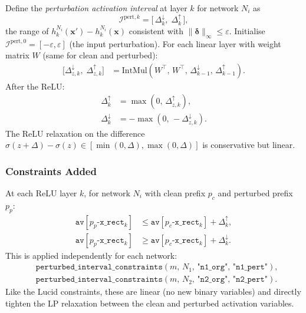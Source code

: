 \documentclass[11pt,a4paper]{article}
\theoremstyle{definition}
\theoremstyle{plain}
\newcommand{\NN}[1]{N_{#1}}
\newcommand{\vx}{\mathbf{x}}
\newcommand{\ve}{\boldsymbol{\delta}}
\newcommand{\vxp}{\mathbf{x}'}
\newcommand{\eps}{\varepsilon}
\newcommand{\RI}[1]{\mathcal{I}^{#1}}
\begin{document}
Define the \emph{perturbation activation interval} at layer $k$ for network $\NN{i}$ as
\[
  \RI{\mathrm{pert},k} = \bigl[\,\Delta_k^{\downarrow},\; \Delta_k^{\uparrow}\,\bigr],
\]
the range of $h_k^{\NN{i}}(\vxp) - h_k^{\NN{i}}(\vx)$ consistent with $\|\ve\|_\infty \le \eps$. Initialise $\RI{\mathrm{pert},0} = [-\eps, \eps]$ (the input perturbation). For each linear layer with weight matrix $W$ (same for clean and perturbed):
\begin{align}
  \bigl[\Delta_{z,k}^{\downarrow},\; \Delta_{z,k}^{\uparrow}\bigr] &= \mathrm{IntMul}(W^\top,\, W^\top,\, \Delta_{k-1}^{\downarrow},\, \Delta_{k-1}^{\uparrow}). \label{eq:pert_linear}
\end{align}
After the ReLU:
\begin{align}
  \Delta_k^{\uparrow} &= \max(0,\, \Delta_{z,k}^{\uparrow}), \label{eq:pert_relu_up}\\
  \Delta_k^{\downarrow} &= -\max(0,\, -\Delta_{z,k}^{\downarrow}). \label{eq:pert_relu_down}
\end{align}
The ReLU relaxation on the difference $\sigma(z+\Delta) - \sigma(z) \in [\min(0,\Delta), \max(0,\Delta)]$ is conservative but linear.

\subsubsection{Constraints Added}

At each ReLU layer $k$, for network $\NN{i}$ with clean prefix $p_c$ and perturbed prefix $p_p$:
\begin{align}
  \mathtt{av}[p_p\text{-}\mathtt{x\_rect}_k] &\le \mathtt{av}[p_c\text{-}\mathtt{x\_rect}_k] + \Delta_k^{\uparrow}, \label{eq:pertc_up}\\
  \mathtt{av}[p_p\text{-}\mathtt{x\_rect}_k] &\ge \mathtt{av}[p_c\text{-}\mathtt{x\_rect}_k] + \Delta_k^{\downarrow}. \label{eq:pertc_down}
\end{align}
This is applied independently for each network:
\begin{align*}
  &\texttt{perturbed\_interval\_constraints}(m,\, \NN{1},\, \texttt{"n1\_org"},\, \texttt{"n1\_pert"}), \\
  &\texttt{perturbed\_interval\_constraints}(m,\, \NN{2},\, \texttt{"n2\_org"},\, \texttt{"n2\_pert"}).
\end{align*}
Like the Lucid constraints, these are linear (no new binary variables) and directly tighten the LP relaxation between the clean and perturbed activation variables.
\end{document}

